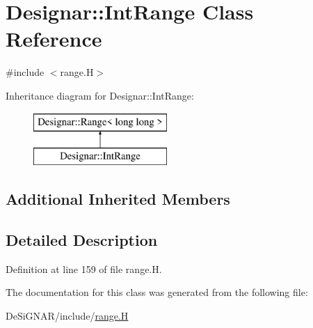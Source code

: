 \hypertarget{class_designar_1_1_int_range}{}\section{Designar\+:\+:Int\+Range Class Reference}
\label{class_designar_1_1_int_range}


{\ttfamily \#include $<$range.\+H$>$}

Inheritance diagram for Designar\+:\+:Int\+Range\+:\begin{figure}[H]
\begin{center}
\leavevmode
\includegraphics[height=2.000000cm]{class_designar_1_1_int_range}
\end{center}
\end{figure}
\subsection*{Additional Inherited Members}


\subsection{Detailed Description}


Definition at line 159 of file range.\+H.



The documentation for this class was generated from the following file\+:\begin{DoxyCompactItemize}
\item 
De\+Si\+G\+N\+A\+R/include/\hyperlink{range_8_h}{range.\+H}\end{DoxyCompactItemize}
